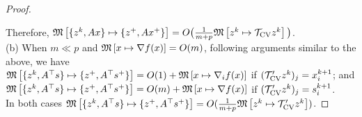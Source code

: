 {{\begin{proof}
\begin{enumerate}
\end{enumerate}
Therefore, $\mathfrak{M}\left[{\{z^k,Ax\}}\mapsto {\{z^+,Ax^+\}}\right]=O\big(\frac{1}{m+p}\mathfrak{M}\left[{z^k}\mapsto {{{\mathcal{T}}_{\textnormal{CV}}}z^k}\right]\big)$. %
\\[5pt]
(b) When $m\ll p$ and $\mathfrak{M}\left[{x}\mapsto {\nabla f(x)}\right]=O(m)$, following  arguments similar to the above, we have\\$\mathfrak{M}\left[{\{z^k,A^\top s\}}\mapsto {\{z^+,A^\top s^+\}}\right]=O(1)+\mathfrak{M}\left[{x}\mapsto {\nabla_i f(x)}\right]$ if $({\mathcal{T}}'_{\textnormal{CV}} z^k)_j=x_i^{k+1}$; and $\mathfrak{M}\left[{\{z^k,A^\top s\}}\mapsto {\{z^+,A^\top s^+\}}\right]=O(m)+\mathfrak{M}\left[{x}\mapsto {\nabla f(x)}\right]$ if $({\mathcal{T}}'_{\textnormal{CV}} z^k)_j=s_i^{k+1}$.\\ In both cases $\mathfrak{M}\left[{\{z^k,A^\top s\}}\mapsto {\{z^+,A^\top s^+\}}\right]=O(\frac{1}{m+p}\mathfrak{M}\left[{z^k}\mapsto {{\mathcal{T}}'_{\textnormal{CV}} z^k}\right])$.
\end{proof}
}}
